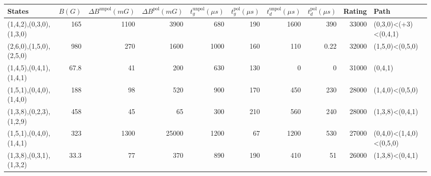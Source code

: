 \begin{tabular}{lrrrrrrrrl}
\hline
 {States}                &   {$B(G)$} &   {$\Delta B^{\text{unpol}}(mG)$} &   {$\Delta B^{\text{pol}}(mG)$} &   {$t^{\text{unpol}}_{g}(\mu s)$} &   {$t^{\text{pol}}_{g}(\mu s)$} &   {$t^{\text{unpol}}_{d}(\mu s)$} &   {$t^{\text{pol}}_{d}(\mu s)$} &   {Rating} & {Path}                  \\
\hline
 (1,4,2),(0,3,0),(1,3,0) &      165   &                              1100 &                            3900 &                               680 &                             190 &                              1600 &                          390    &      33000 & (0,3,0)<(+3)<(0,4,1)    \\
 (2,6,0),(1,5,0),(2,5,0) &      980   &                               270 &                            1600 &                              1000 &                             160 &                               110 &                            0.22 &      32000 & (1,5,0)<(0,5,0)         \\
 (1,4,5),(0,4,1),(1,4,1) &       67.8 &                                41 &                             200 &                               630 &                             130 &                                 0 &                            0    &      31000 & (0,4,1)                 \\
 (1,5,1),(0,4,0),(1,4,0) &      188   &                                98 &                             520 &                               900 &                             170 &                               450 &                          230    &      28000 & (1,4,0)<(0,5,0)         \\
 (1,3,8),(0,2,3),(1,2,9) &      458   &                                45 &                              65 &                               300 &                             210 &                               560 &                          240    &      28000 & (1,3,8)<(0,4,1)         \\
 (1,5,1),(0,4,0),(1,4,1) &      323   &                              1300 &                           25000 &                              1200 &                              67 &                              1200 &                          530    &      27000 & (0,4,0)<(1,4,0)<(0,5,0) \\
 (1,3,8),(0,3,1),(1,3,2) &       33.3 &                                77 &                             370 &                               890 &                             190 &                               410 &                           51    &      26000 & (1,3,8)<(0,4,1)         \\

\end{tabular}
